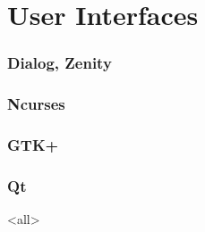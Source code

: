 \mode*
\part{User Interfaces}

\section{Dialog, Zenity}
\label{sec:dialog}

\section{Ncurses}
\label{sec:curses}

\section{GTK+}
\label{sec:gtk+}

\section{Qt}
\label{sec:qt}


\mode<all>
